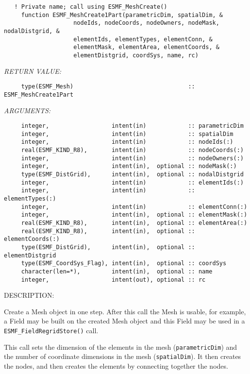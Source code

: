   
\begin{verbatim}   ! Private name; call using ESMF_MeshCreate()
     function ESMF_MeshCreate1Part(parametricDim, spatialDim, &
                    nodeIds, nodeCoords, nodeOwners, nodeMask, nodalDistgrid, &
                    elementIds, elementTypes, elementConn, &
                    elementMask, elementArea, elementCoords, &
                    elementDistgrid, coordSys, name, rc)\end{verbatim}{\em RETURN VALUE:}
\begin{verbatim}     type(ESMF_Mesh)                                 :: ESMF_MeshCreate1Part\end{verbatim}{\em ARGUMENTS:}
\begin{verbatim}     integer,                  intent(in)            :: parametricDim
     integer,                  intent(in)            :: spatialDim
     integer,                  intent(in)            :: nodeIds(:)
     real(ESMF_KIND_R8),       intent(in)            :: nodeCoords(:)
     integer,                  intent(in)            :: nodeOwners(:)
     integer,                  intent(in),  optional :: nodeMask(:)
     type(ESMF_DistGrid),      intent(in),  optional :: nodalDistgrid
     integer,                  intent(in)            :: elementIds(:)
     integer,                  intent(in)            :: elementTypes(:)
     integer,                  intent(in)            :: elementConn(:)
     integer,                  intent(in),  optional :: elementMask(:)
     real(ESMF_KIND_R8),       intent(in),  optional :: elementArea(:)
     real(ESMF_KIND_R8),       intent(in),  optional :: elementCoords(:)
     type(ESMF_DistGrid),      intent(in),  optional :: elementDistgrid
     type(ESMF_CoordSys_Flag), intent(in),  optional :: coordSys
     character(len=*),         intent(in),  optional :: name
     integer,                  intent(out), optional :: rc\end{verbatim}
{\sf DESCRIPTION:\\ }


     Create a Mesh object in one step. After this call the Mesh is usable, for
     example, a Field may be built on the created Mesh object and
     this Field may be used in a {\tt ESMF\_FieldRegridStore()} call.
  
     This call sets the dimension of the elements in the mesh
     ({\tt parametricDim}) and the number of coordinate dimensions in the mesh
     ({\tt spatialDim}). It then creates the nodes, and
     then creates the elements by connecting together the nodes.
  
